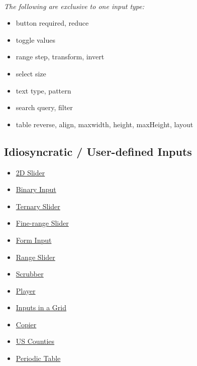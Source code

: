 \addtolength{\tabcolsep}{3pt}
\\
\textit{The following are exclusive to one input type:}
\begin{itemize}
    \item button \quad required, reduce
    \item toggle \quad values
    \item range  \quad step, transform, invert
    \item select \quad size
    \item text   \quad type, pattern
    \item search \quad query, filter
    \item table  \quad reverse, align, maxwidth, height, maxHeight, layout
\end{itemize}


\subsection*{Idiosyncratic / User-defined Inputs}



\begin{minipage}{3cm}
\begin{itemize}
    \item \href{https://observablehq.com/@mootari/2d-slider}{2D Slider}
    \item \href{https://observablehq.com/@rreusser/binary-input}{Binary Input}
    \item \href{https://observablehq.com/@yurivish/ternary-slider}{Ternary Slider}
    \item \href{https://observablehq.com/@rreusser/fine-range}{Fine-range Slider}
    \item \href{https://observablehq.com/@mbostock/form-input}{Form Input}
    \item \href{https://observablehq.com/@mootari/range-slider}{Range Slider}
\end{itemize}
\end{minipage}\begin{minipage}{3cm}
\begin{itemize}
    \item \href{https://observablehq.com/@mbostock/scrubber}{Scrubber}
    \item \href{https://observablehq.com/@oscar6echo/player}{Player}
    \item \href{https://observablehq.com/@bumbeishvili/input-groups}{Inputs in a Grid}
    \item \href{https://observablehq.com/@mbostock/copier}{Copier}
    \item \href{https://observablehq.com/@awhitty/fips-county-code-brush}{US Counties}
    \item \href{https://observablehq.com/@bobkerns/elements-input}{Periodic Table}
\end{itemize}
\end{minipage}
